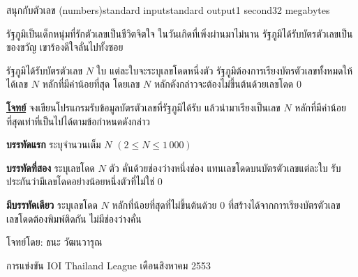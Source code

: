\documentclass[11pt,a4paper]{article}
\begin{document}
\begin{problem}{สนุกกับตัวเลข (numbers)}{standard input}{standard output}{1 second}{32 megabytes}

รัฐภูมิเป็นเด็กหนุ่มที่รักตัวเลขเป็นชีวิตจิตใจ ในวันเกิดที่เพิ่งผ่านมาไม่นาน รัฐภูมิได้รับบัตรตัวเลขเป็นของขวัญ เขาร้องดีใจลั่นไปทั้งซอย

รัฐภูมิได้รับบัตรตัวเลข $N$ ใบ แต่ละใบจะระบุเลขโดดหนึ่งตัว รัฐภูมิต้องการเรียงบัตรตัวเลขทั้งหมดให้ได้เลข $N$ หลักที่มีค่าน้อยที่สุด โดยเลข $N$ หลักดังกล่าวจะต้องไม่ขึ้นต้นด้วยเลขโดด $0$

\underline{\textbf{โจทย์}} จงเขียนโปรแกรมรับข้อมูลบัตรตัวเลขที่รัฐภูมิได้รับ แล้วนำมาเรียงเป็นเลข $N$ หลักที่มีค่าน้อยที่สุดเท่าที่เป็นไปได้ตามข้อกำหนดดังกล่าว

\InputFile

\textbf{บรรทัดแรก} ระบุจำนวนเต็ม $N$ $(2 \leq N \leq 1\,000)$ 

\textbf{บรรทัดที่สอง} ระบุเลขโดด $N$ ตัว คั่นด้วยช่องว่างหนึ่งช่อง แทนเลขโดดบนบัตรตัวเลขแต่ละใบ รับประกันว่ามีเลขโดดอย่างน้อยหนึ่งตัวที่ไม่ใช่ $0$

\OutputFile

\textbf{มีบรรทัดเดียว} ระบุเลขโดด $N$ หลักที่น้อยที่สุดที่ไม่ขึ้นต้นด้วย $0$ ที่สร้างได้จากการเรียงบัตรตัวเลข เลขโดดต้องพิมพ์ติดกัน ไม่มีช่องว่างคั่น

\Examples

\begin{example}
%
%
\end{example}

\newpage
\Source

โจทย์โดย: ธนะ วัฒนวารุณ

การแข่งขัน IOI Thailand League เดือนสิงหาคม 2553

\end{problem}
\end{document}
